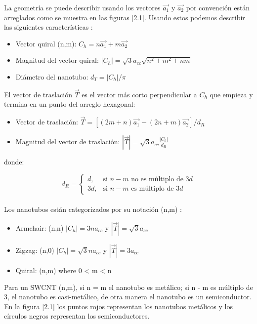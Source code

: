 La geometría se puede describir usando los vectores $\vec{a_1}$ y $\vec{a_2}$ por convención están arreglados como se muestra en las figuras [2.1]. Usando estos podemos describir las siguientes características \cite{Melendez2016}:\\

\begin{itemize}
    \item Vector quiral (n,m): $C_h = n\vec{a_1} + m\vec{a_2}$
    \item Magnitud del vector quiral: $\left|C_h\right| = \sqrt{3}a_{cc}\sqrt{n^2+m^2+nm}$
    \item Diámetro del nanotubo: $d_T = \left|C_h\right|/\pi$
\end{itemize}

El vector de traslación $\vec{T}$ es el vector más corto perpendicular a $C_h$ que empieza y termina en un punto del arreglo hexagonal:

\begin{itemize}
    \item Vector de traslación: $\vec{T} = \left[\left(2m+n\right)\vec{a_1} - \left(2n+m\right)\vec{a_2}\right]/d_R$
    \item Magnitud del vector de traslación: $\left|\vec{T}\right|=\sqrt{3}a_{cc}\frac{\left|C_h\right|}{d_R}$
\end{itemize}

donde:

\begin{equation}\label{dR}
    d_R =
    \begin{cases} 
    d,& \text{si } n-m \text{ no es múltiplo de } 3d\\
    3d,& \text{si } n-m \text{ es múltiplo de } 3d
    \end{cases}
\end{equation}\\

Los nanotubos están categorizados por su notación (n,m) \cite{Melendez2016}:

\begin{itemize}
    \item Armchair: (n,n) $\left|C_h\right|=3na_{cc}$ y $\left|\vec{T}\right|=\sqrt{3}a_{cc}$
    \item Zigzag: (n,0) $\left|C_h\right|=\sqrt{3}na_{cc}$ y $\left|\vec{T}\right|=3a_{cc}$
    \item Quiral: (n,m) where 0 < m < n
\end{itemize}

Para un SWCNT (n,m), si n = m el nanotubo es metálico; si n - m es múltiplo de 3, el nanotubo es casi-metálico, de otra manera el nanotubo es un semiconductor. En la figura [2.1] los puntos rojos representan los nanotubos metálicos y los círculos negros representan los semiconductores.\\

